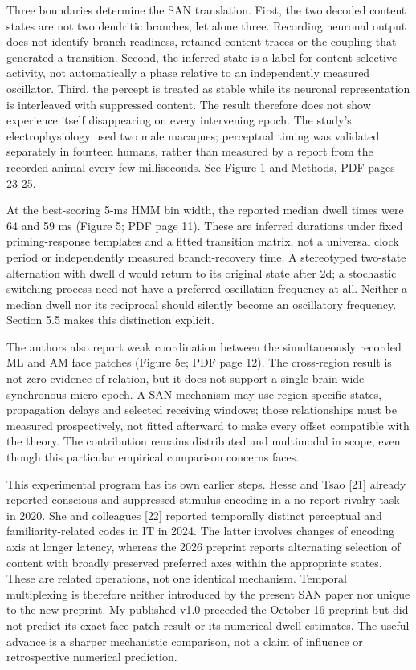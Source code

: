 \documentclass[
  american,
  11pt,
  letterpaper,
]{article}
\begin{document}
Three boundaries determine the SAN translation. First, the two decoded content states are not two dendritic branches, let alone three. Recording neuronal output does not identify branch readiness, retained content traces or the coupling that generated a transition. Second, the inferred state is a label for content-selective activity, not automatically a phase relative to an independently measured oscillator. Third, the percept is treated as stable while its neuronal representation is interleaved with suppressed content. The result therefore does not show experience itself disappearing on every intervening epoch. The study's electrophysiology used two male macaques; perceptual timing was validated separately in fourteen humans, rather than measured by a report from the recorded animal every few milliseconds. See Figure 1 and Methods, PDF pages 23-25.

At the best-scoring 5-ms HMM bin width, the reported median dwell times were 64 and 59 ms (Figure 5; PDF page 11). These are inferred durations under fixed priming-response templates and a fitted transition matrix, not a universal clock period or independently measured branch-recovery time. A stereotyped two-state alternation with dwell d would return to its original state after 2d; a stochastic switching process need not have a preferred oscillation frequency at all. Neither a median dwell nor its reciprocal should silently become an oscillatory frequency. Section 5.5 makes this distinction explicit.

The authors also report weak coordination between the simultaneously recorded ML and AM face patches (Figure 5e; PDF page 12). The cross-region result is not zero evidence of relation, but it does not support a single brain-wide synchronous micro-epoch. A SAN mechanism may use region-specific states, propagation delays and selected receiving windows; those relationships must be measured prospectively, not fitted afterward to make every offset compatible with the theory. The contribution remains distributed and multimodal in scope, even though this particular empirical comparison concerns faces.

This experimental program has its own earlier steps. Hesse and Tsao {[}21{]} already reported conscious and suppressed stimulus encoding in a no-report rivalry task in 2020. She and colleagues {[}22{]} reported temporally distinct perceptual and familiarity-related codes in IT in 2024. The latter involves changes of encoding axis at longer latency, whereas the 2026 preprint reports alternating selection of content with broadly preserved preferred axes within the appropriate states. These are related operations, not one identical mechanism. Temporal multiplexing is therefore neither introduced by the present SAN paper nor unique to the new preprint. My published v1.0 preceded the October 16 preprint but did not predict its exact face-patch result or its numerical dwell estimates. The useful advance is a sharper mechanistic comparison, not a claim of influence or retrospective numerical prediction.
\end{document}
